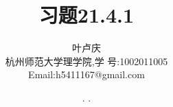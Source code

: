 \documentclass[a4paper, 12pt]{article} %
\makeatletter
\renewcommand{\maketitle}{ %
  \renewcommand\refname{参考文献}
  \newcommand{\D}{\displaystyle}\newcommand{\ri}{\Rightarrow}
  \newcommand{\ds}{\displaystyle} \renewcommand{\ni}{\noindent}
  \newcommand{\pa}{\partial} \newcommand{\Om}{\Omega}
  \newcommand{\om}{\omega} \newcommand{\sik}{\sum_{i=1}^k}
  \newcommand{\vov}{\Vert\omega\Vert} \newcommand{\Umy}{U_{\mu_i,y^i}}
  \newcommand{\lamns}{\lambda_n^{^{\scriptstyle\sigma}}}
  \newcommand{\chiomn}{\chi_{_{\Omega_n}}}
  \newcommand{\ullim}{\underline{\lim}} \newcommand{\bsy}{\boldsymbol}
  \newcommand{\mvb}{\mathversion{bold}} \newcommand{\la}{\lambda}
  \newcommand{\La}{\Lambda} \newcommand{\va}{\varepsilon}
  \newcommand{\be}{\beta} \newcommand{\al}{\alpha}
  \newcommand{\dis}{\displaystyle} \newcommand{\R}{{\mathbb R}}
  \newcommand{\N}{{\mathbb N}} \newcommand{\cF}{{\mathcal F}}
  \newcommand{\gB}{{\mathfrak B}} \newcommand{\eps}{\epsilon}
  \begin{flushright} %
    {\LARGE\@title} %
    
    \vspace{50pt} %
    
    {\large\@author} %
    \\\@date %
    
    \vspace{40pt} %
  \end{flushright}
}
\makeatother
\begin{document}
\begin{CJK}{UTF8}{gkai}
  \title{\textbf{习题21.4.1}}
  \author{\small{叶卢庆}\\{\small{杭州师范大学理学院,学
        号:1002011005}}\\{\small{Email:h5411167@gmail.com}}} %
  \renewcommand{\today}{\number\year. \number\month. \number\day}
  \date{\today} %
  
  
  
  \maketitle %
  
  
  
  
  
  
  

\end{CJK}
\end{document}
